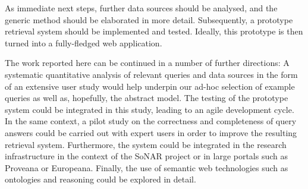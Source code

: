 As immediate next steps, further data sources should be analysed, and the generic method
should be elaborated in more detail. Subsequently, a prototype retrieval system should be implemented
and tested. Ideally, this prototype is then turned into a fully-fledged web application.

The work reported here can be continued in a number of further directions:
A systematic quantitative analysis of relevant queries and data sources
in the form of an extensive user study
would help underpin our ad-hoc selection of example queries
as well as, hopefully, the abstract model. 
The testing of the prototype system could be integrated in this study,
leading to an agile development cycle.
In the same context, a pilot study on the correctness and completeness of query answers
could be carried out with expert users in order to improve the resulting retrieval system.
Furthermore, the system could be integrated in the research infrastructure
in the context of the \gls{SoNAR} project or in large portals such as Proveana or Europeana.
Finally, the use of semantic web technologies such as ontologies and reasoning
could be explored in detail.

